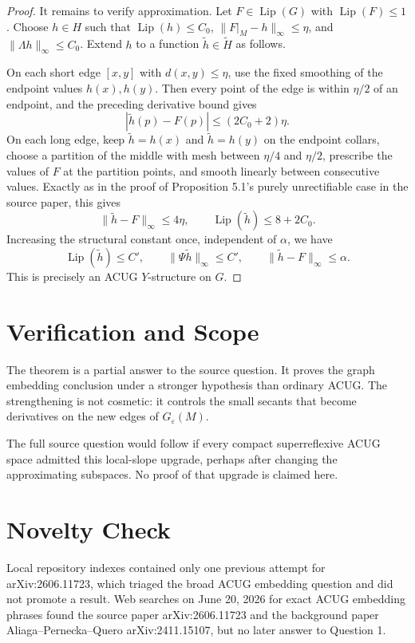 \documentclass[11pt]{article}
\newcommand{\Lip}{\operatorname{Lip}}
\newcommand{\eps}{\varepsilon}
\begin{document}
\begin{proof}
It remains to verify approximation.  Let \(F\in\Lip(G)\) with \(\Lip(F)\le1\).
Choose \(h\in H\) such that \(\Lip(h)\le C_0\),
\(\|F|_M-h\|_\infty\le\eta\), and
\(\|\Lambda h\|_\infty\le C_0\).  Extend \(h\) to a function
\(\widetilde h\in\widetilde H\) as follows.

On each short edge \([x,y]\) with \(d(x,y)\le\eta\), use the fixed smoothing of
the endpoint values \(h(x),h(y)\).  Then every point of the edge is within
\(\eta/2\) of an endpoint, and the preceding derivative bound gives
\[
   |\widetilde h(p)-F(p)|\le (2C_0+2)\eta .
\]
On each long edge, keep \(\widetilde h=h(x)\) and \(\widetilde h=h(y)\) on
the endpoint collars, choose a partition of the middle with mesh between
\(\eta/4\) and \(\eta/2\), prescribe the values of \(F\) at the partition
points, and smooth linearly between consecutive values.  Exactly as in the
proof of Proposition 5.1's purely unrectifiable case in the source paper, this
gives
\[
   \|\widetilde h-F\|_\infty\le 4\eta,\qquad
   \Lip(\widetilde h)\le 8+2C_0 .
\]
Increasing the structural constant once, independent of \(\alpha\), we have
\[
   \Lip(\widetilde h)\le C',\qquad
   \|\Psi\widetilde h\|_\infty\le C',\qquad
   \|\widetilde h-F\|_\infty\le \alpha .
\]
This is precisely an ACUG \(Y\)-structure on \(G\).
\end{proof}

\section*{Verification and Scope}

The theorem is a partial answer to the source question.  It proves the graph
embedding conclusion under a stronger hypothesis than ordinary ACUG.  The
strengthening is not cosmetic: it controls the small secants that become
derivatives on the new edges of \(G_\eps(M)\).

The full source question would follow if every compact superreflexive ACUG
space admitted this local-slope upgrade, perhaps after changing the
approximating subspaces.  No proof of that upgrade is claimed here.

\section*{Novelty Check}

Local repository indexes contained only one previous attempt for arXiv:2606.11723,
which triaged the broad ACUG embedding question and did not promote a result.
Web searches on June 20, 2026 for exact ACUG embedding phrases found the source
paper arXiv:2606.11723 and the background paper Aliaga--Pernecka--Quero
arXiv:2411.15107, but no later answer to Question 1.
\end{document}
